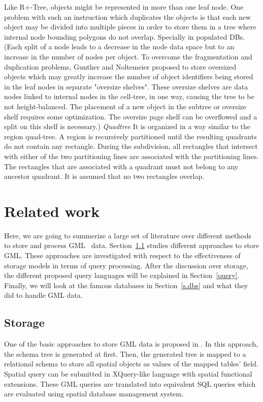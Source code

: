 \documentclass[a4paper,12pt]{article}
\begin{document}
Like R+-Tree, objects might be represented in more than one leaf node. One problem with such an instruction which duplicates the objects is that each new object may be divided into multiple pieces in order to store them in a tree where internal node bounding polygons do not overlap. Specially in populated DBs. 
(Each split of a node leads to a decrease in the node data space but to an increase in the number of nodes per object. To overcome the fragmentation and duplication problems, Gunther and Noltemeier proposed to store oversized objects which may greatly increase the number of object identifiers being stored in the leaf nodes in separate "oversize shelves". These oversize shelves are data nodes linked to internal nodes in the cell-tree, in one way, causing the tree to be not height-balanced. The placement of a new object in the subtree or oversize shelf requires some optimization. The oversize page shelf can be overflowed and a split on this shelf is necessary.)
\emph{Quadtree}
It is organized in a way similar to the region quad-tree. A region is recursively partitioned until the resulting quadrants do not contain any rectangle. During the subdivision, all rectangles that intersect with either of the two partitioning lines are associated with the partitioning lines. The rectangles that are associated with a quadrant must not belong to any ancestor quadrant. It is assumed that no two rectangles overlap.
\newpage








\section{Related work}
\label{s.rwork}
Here, we are going to summerize a large set of literature over different methods
to store and process GML~\cite{gml} data. Section~\ref{storage} studies
different approaches to store GML. These approaches are investigated
with respect to the effectiveness of storage models in terms of query processing.
After the discussion over storage, the different proposed query languages
will be explained in Section~\ref{query}. Finally, we will look at the
famous databases in Section~\ref{s.dbs} and what they did to handle
GML data.
  
\subsection{Storage}
\label{storage}
One of the basic approaches to store GML data is proposed in \cite{Li2004}.
In this approach, the schema tree is generated at first. Then, the generated
tree is mapped to a relational schema to store all spatial objects as 
values of the mapped tables' field. Spatial query can be submitted 
in XQuery\cite{xquery}-like language with spatial functional extensions.
These GML queries are translated into equivalent SQL queries which are evaluated 
using spatial database management system.
\end{document}
